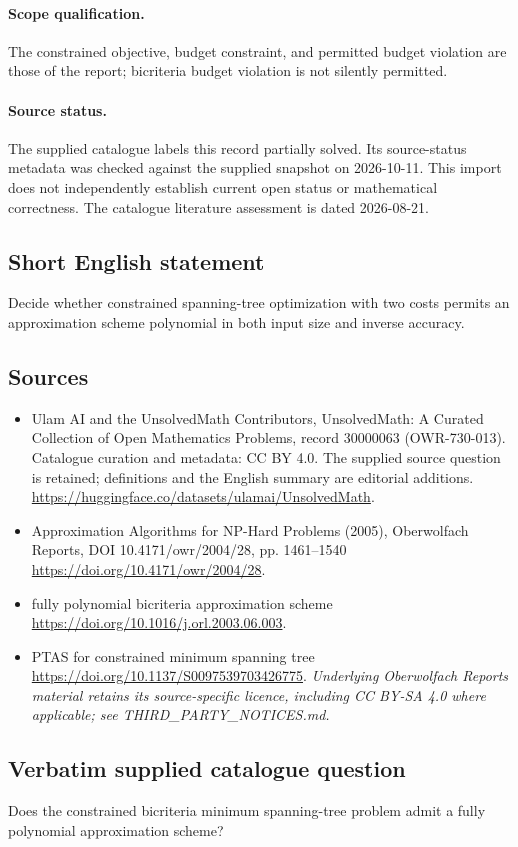 \documentclass[11pt]{article}
\begin{document}
\paragraph{Scope qualification.}
The constrained objective, budget constraint, and permitted budget violation are those of the report; bicriteria budget violation is not silently permitted.
\paragraph{Source status.}
The supplied catalogue labels this record partially solved. Its source-status metadata was checked against the supplied snapshot on 2026-10-11. This import does not independently establish current open status or mathematical correctness. The catalogue literature assessment is dated 2026-08-21.
\subsection{Short English statement}
Decide whether constrained spanning-tree optimization with two costs permits an approximation scheme polynomial in both input size and inverse accuracy.
\subsection{Sources}
\begin{itemize}
\item[S1] Ulam AI and the UnsolvedMath Contributors, UnsolvedMath: A Curated Collection of Open Mathematics Problems, record 30000063 (OWR-730-013). Catalogue curation and metadata: CC BY 4.0. The supplied source question is retained; definitions and the English summary are editorial additions.
\url{https://huggingface.co/datasets/ulamai/UnsolvedMath}.
\item[S2] Approximation Algorithms for NP-Hard Problems (2005), Oberwolfach Reports, DOI 10.4171/owr/2004/28, pp. 1461--1540
\url{https://doi.org/10.4171/owr/2004/28}.
\item[S3] fully polynomial bicriteria approximation scheme
\url{https://doi.org/10.1016/j.orl.2003.06.003}.
\item[S4] PTAS for constrained minimum spanning tree
\url{https://doi.org/10.1137/S0097539703426775}.
\textit{Underlying Oberwolfach Reports material retains its source-specific licence, including CC BY-SA 4.0 where applicable; see THIRD\_PARTY\_NOTICES.md.}
\end{itemize}
\subsection{Verbatim supplied catalogue question}
Does the constrained bicriteria minimum spanning-tree problem admit a fully polynomial approximation scheme?
\end{document}
